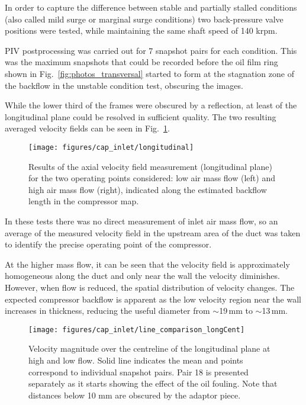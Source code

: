 In order to capture the difference between stable and partially stalled conditions (also called mild surge or marginal surge conditions) two back-pressure valve positions were tested, while maintaining the same shaft speed of 140 krpm.

PIV postprocessing was carried out for 7 snapshot pairs for each condition. This was the maximum snapshots that could be recorded before the oil film ring shown in Fig.~\ref{fig:photos_transversal} started to form at the stagnation zone of the backflow in the unstable condition test, obscuring the images.

While the lower third of the frames were obscured by a reflection, at least  of the longitudinal plane could be resolved in sufficient quality. The two resulting averaged velocity fields can be seen in Fig.~\ref{fig:longitudinal}.

\begin{figure}[t!]
\hspace{-0.1\textwidth}
\texttt{[image: figures/cap\_inlet/longitudinal]}
\caption[Axial velocity fields measured by PIV]{Results of the axial velocity field measurement (longitudinal plane) for the two operating points considered: low air mass flow (left) and high air mass flow (right), indicated along the estimated backflow length in the compressor map.}
\label{fig:longitudinal}
\end{figure}

In these tests there was no direct measurement of inlet air mass flow, so an average of the measured velocity field in the upstream area of the duct was taken to identify the precise operating point of the compressor.

At the higher mass flow, it can be seen that the velocity field is approximately homogeneous along the duct and only near the wall the velocity diminishes. However, when flow is reduced, the spatial distribution of velocity changes. The expected compressor backflow is apparent as the low velocity region near the wall increases in thickness, reducing the useful diameter from $\sim$19\,mm to $\sim$13\,mm.

\begin{figure}[t!]
\centering
\texttt{[image: figures/cap\_inlet/line\_comparison\_longCent]}
\caption[Centreline velocity in the longitudinal plane]{Velocity magnitude over the centreline of the longitudinal plane at high and low flow. Solid line indicates the mean and points correspond to individual snapshot pairs. Pair 18 is presented separately as it starts showing the effect of the oil fouling. Note that distances below 10 mm are obscured by the adaptor piece.}
\label{fig:line_comp_long}
\end{figure}

